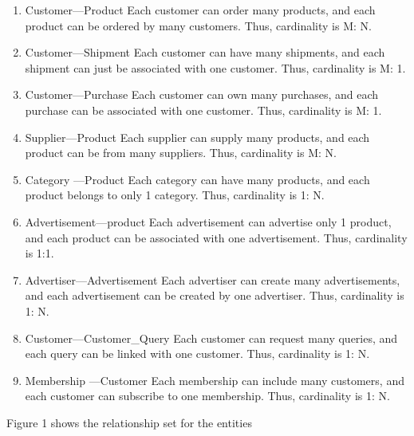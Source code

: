 \documentclass[
  letterpaper,
  DIV=11,
  numbers=noendperiod]{scrartcl}
\providecommand{\tightlist}{%
  \setlength{\itemsep}{0pt}\setlength{\parskip}{0pt}}\usepackage{longtable,booktabs,array}
\begin{document}
\begin{enumerate}
\def\labelenumi{\arabic{enumi}.}
\tightlist
\item
  Customer---Product Each customer can order many products, and each
  product can be ordered by many customers. Thus, cardinality is M: N.
\item
  Customer---Shipment Each customer can have many shipments, and each
  shipment can just be associated with one customer. Thus, cardinality
  is M: 1.
\item
  Customer---Purchase Each customer can own many purchases, and each
  purchase can be associated with one customer. Thus, cardinality is M:
  1.
\item
  Supplier---Product Each supplier can supply many products, and each
  product can be from many suppliers. Thus, cardinality is M: N.
\item
  Category ---Product Each category can have many products, and each
  product belongs to only 1 category. Thus, cardinality is 1: N.
\item
  Advertisement---product Each advertisement can advertise only 1
  product, and each product can be associated with one advertisement.
  Thus, cardinality is 1:1.
\item
  Advertiser---Advertisement Each advertiser can create many
  advertisements, and each advertisement can be created by one
  advertiser. Thus, cardinality is 1: N.
\item
  Customer---Customer\_Query Each customer can request many queries, and
  each query can be linked with one customer. Thus, cardinality is 1: N.
\item
  Membership ---Customer Each membership can include many customers, and
  each customer can subscribe to one membership. Thus, cardinality is 1:
  N.
\end{enumerate}

Figure 1 shows the relationship set for the entities
\end{document}
